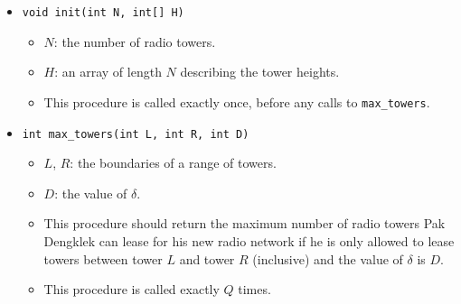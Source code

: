 \begin{itemize}
    \item \texttt{void init(int N, int[] H)}
\begin{itemize}

\item $N$: the number of radio towers.
\item $H$: an array of length $N$ describing the tower heights.
\item This procedure is called exactly once, before any calls to \texttt{max\_towers}.
\end{itemize}

\item \texttt{int max\_towers(int L, int R, int D)}
\begin{itemize}

\item $L$, $R$: the boundaries of a range of towers.
\item $D$: the value of $\delta$.
\item This procedure should return the maximum number of radio towers Pak Dengklek can lease for his new radio network if he is only allowed to lease towers between tower $L$ and tower $R$ (inclusive) and the value of $\delta$ is $D$.
\item This procedure is called exactly $Q$ times.
\end{itemize}

\end{itemize}


